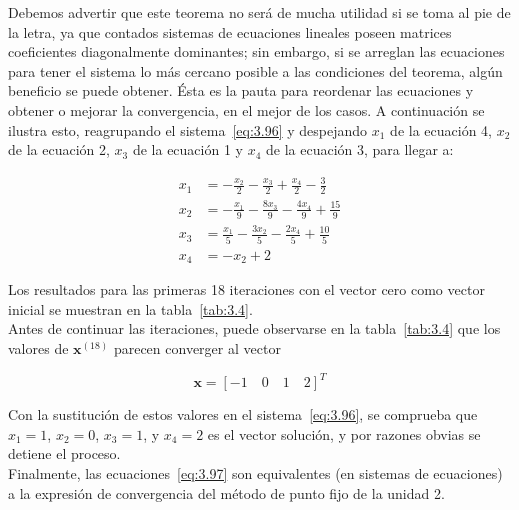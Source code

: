 \documentclass[12pt,letterpaper]{article}
\theoremstyle{definition}
\theoremstyle{plain}
\theoremstyle{remark}
\begin{document}
Debemos advertir que este teorema no será de mucha utilidad si se toma al pie de la letra, ya que contados sistemas de ecuaciones lineales poseen matrices coeficientes diagonalmente dominantes; sin embargo, si se arreglan las ecuaciones para tener el sistema lo más cercano posible a las condiciones del teorema, algún beneficio se puede obtener. Ésta es la pauta para reordenar las ecuaciones y obtener o mejorar la convergencia, en el mejor de los casos. A continuación se ilustra esto, reagrupando el sistema~\eqref{eq:3.96} y despejando $x_1$ de la ecuación 4, $x_2$ de la ecuación 2, $x_3$ de la ecuación 1 y $x_4$ de la ecuación 3, para llegar a:

\[
\begin{aligned}
x_1 &= -\frac{x_2}{2} - \frac{x_3}{2} + \frac{x_4}{2} - \frac{3}{2} \\
x_2 &= -\frac{x_1}{9} - \frac{8x_3}{9} - \frac{4x_4}{9} + \frac{15}{9} \\
x_3 &= \frac{x_1}{5} - \frac{3x_2}{5} - \frac{2x_4}{5} + \frac{10}{5} \\
x_4 &= -x_2 + 2
\end{aligned}
\]

Los resultados para las primeras 18 iteraciones con el vector cero como vector inicial se muestran en la tabla~\ref{tab:3.4}.\\

Antes de continuar las iteraciones, puede observarse en la tabla~\ref{tab:3.4} que los valores de $\mathbf{x}^{(18)}$ parecen converger al vector

\[
\mathbf{x} = [-1 \quad 0 \quad 1 \quad 2]^T
\]

Con la sustitución de estos valores en el sistema~\eqref{eq:3.96}, se comprueba que $x_1 = 1$, $x_2 = 0$, $x_3 = 1$, y $x_4 = 2$ es el vector solución, y por razones obvias se detiene el proceso.\\

Finalmente, las ecuaciones~\eqref{eq:3.97} son equivalentes (en sistemas de ecuaciones) a la expresión de convergencia del método de punto fijo de la unidad 2.
\end{document}
